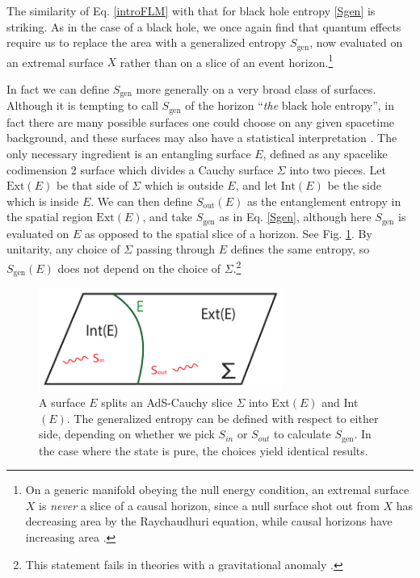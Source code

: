 \documentclass[12pt]{article}
\theoremstyle{remark}
\numberwithin{equation}{section}
\numberwithin{equation}{section}
\begin{document}
The similarity of Eq. \ref{introFLM} with that for black hole entropy \ref{Sgen} is striking.  As in the case of a black hole, we once again find that quantum effects require us to replace the area with a generalized entropy $S_\mathrm{gen}$, now evaluated on an extremal surface $X$ rather than on a slice of an event horizon.\footnote{On a generic manifold obeying the null energy condition, an extremal surface $X$ is \emph{never} a slice of a causal horizon, since a null surface shot out from $X$ has decreasing area by the Raychaudhuri equation, while causal horizons have increasing area \cite{HawkingEllis}.}

In fact we can define $S_\mathrm{gen}$ more generally on a very broad class of surfaces.  Although it is tempting to call $S_\mathrm{gen}$ of the horizon ``\emph{the} black hole entropy'', in fact there are many possible surfaces one could choose on any given spacetime background, and these surfaces may also have a statistical interpretation \cite{Sorkin83, Jacobson95, BianchiMyers12, Balasubramanian:2013lsa, Myers:2014jia, Czech:2014wka}.  The only necessary ingredient is an entangling surface $E$, defined as any spacelike codimension 2 surface which divides a Cauchy surface $\Sigma$ into two pieces.  Let $\mathrm{Ext}(E)$ be that side of $\Sigma$ which is outside $E$, and let $\mathrm{Int}(E)$ be the side which is inside $E$.  We can then define $S_\mathrm{out}(E)$ as the entanglement entropy in the spatial region $\mathrm{Ext}(E)$, and take $S_{\text{gen}}$ as in Eq. \ref{Sgen}, although here $S_{\text{gen}}$ is evaluated on $E$ as opposed to the spatial slice of a horizon.  See Fig. \ref{EntanglingSurface}. By unitarity, any choice of $\Sigma$ passing through $E$ defines the same entropy, so $S_\mathrm{gen}(E)$ does not depend on the choice of $\Sigma$.\footnote{This statement fails in theories with a gravitational anomaly \cite{Wall:2011kb, WallIqbal}.}  

\begin{figure}[ht]
\begin{center}
\includegraphics[width=8cm]{EntanglingSurface.pdf} 
\caption{A surface $E$ splits an AdS-Cauchy slice $\Sigma$ into Ext$(E)$ and Int$(E)$. The generalized entropy can be defined with respect to either side, depending on whether we pick $S_{in}$ or $S_{out}$ to calculate $S_{\text{gen}}$. In the case where the state is pure, the choices yield identical results.
}
\label{EntanglingSurface}
\end{center}
\end{figure}
\end{document}
